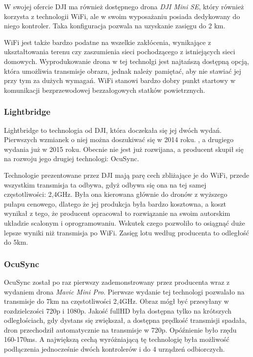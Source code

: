 \hspace{1cm}W swojej ofercie DJI ma również dostępnego drona \emph{DJI Mini SE}, który również korzysta z technologii WiFi, ale w swoim wyposażaniu posiada dedykowany do niego kontroler. Taka konfiguracja pozwala na uzyskanie zasięgu do 2 km. \cite{dji-mavic-mini-se-spec}

\hspace{1cm}WiFi jest także bardzo podatne na wszelkie zakłócenia, wynikające z ukształtowania terenu czy zaszumienia sieci pochodzącego z istniejących sieci domowych. Wyprodukowanie drona w tej technolgi jest najtańszą dostępną opcją, która umożliwia transmisje obrazu, jednak należy pamiętać, aby nie stawiać jej przy tym za dużych wymagań. WiFi stanowi bardzo dobry punkt startowy w komunikacji bezprzewodowej bezzałogowych statków powietrznych.

\subsubsection{Lightbridge}
\hspace{1cm}Lightbridge to technologia od DJI, która doczekała się jej dwóch wydań. Pierwszych wzmianek o niej można doszukiwać się w 2014 roku. \cite{lightbridge-dji}, a drugiego wydania już w 2015 roku\cite{lightbridge2-dji}. Obecnie nie jest już rozwijana, a producent skupił się na rozwoju jego drugiej technologi: OcuSync.

\hspace{1cm}Technologie prezentowane przez DJI mają parę cech zbliżające je do WiFi, przede wszystkim transmisja ta odbywa, gdyż odbywa się ona na tej samej częstotliwości: 2,4GHz. Była ona kierowana głównie do dronów z wyższego pułapu cenowego, dlatego że jej produkcja była bardzo kosztowna, a koszt wynikał z tego, że producent opracował to rozwiązanie na swoim autorskim układzie scalonym i oprogramowaniu. Wskutek czego pozwoliło to osiągnąć duże lepsze wyniki niż transmisja po WiFi. Zasięg lotu według producenta to odległość do 5km.

\subsubsection{OcuSync} 
\hspace{1cm}OcuSync został po raz pierwszy zademonstrowany przez producenta wraz z wydaniem drona \emph{Mavic Mini Pro}. Pierwsze wydanie tej technologi pozwalało na transmisje do 7km na częstotliwości 2,4GHz. Obraz mógł być przesyłany w rozdzielczości 720p i 1080p. Jakość fullHD była dostępna tylko na krótszych odległościach, gdy dystans się zwiększał, a dostępna prędkość transmisji spadała, dron przechodził automatycznie na transmisje w 720p. Opóźnienie było rzędu 160-170ms. A największą cechą wyróżniającą tę technologię była możliwość podłączenia jednocześnie dwóch kontrolerów i do 4 urządzeń odbiorczych.

